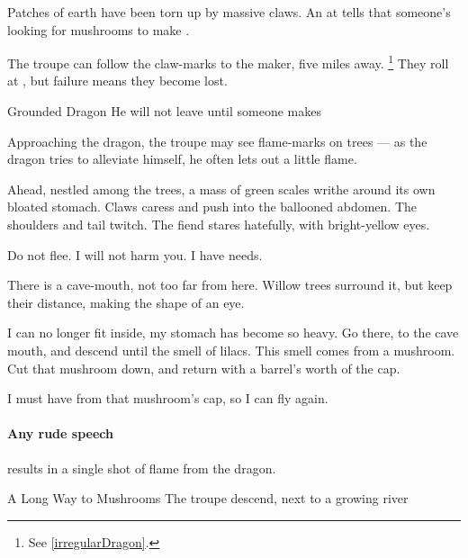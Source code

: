 \documentclass[10pt,twoside]{book}
\begin{document}
Patches of earth have been torn up by massive claws.
An  at \tn[12] tells  that someone's looking for mushrooms to make .

The troupe can follow the claw-marks to the maker, five miles away.%
\footnote{See \vref{irregularDragon}.}
They roll  at \tn[6], but failure means they become lost.

{Grounded Dragon}%
{He will not leave until someone makes }%

\label{irregularDragon}

Approaching the dragon, the troupe may see flame-marks on trees --- as the dragon tries to alleviate himself, he often lets out a little flame.

\begin{boxtext}
  Ahead, nestled among the trees, a mass of green scales writhe around its own bloated stomach.
  Claws caress and push into the ballooned abdomen.
  The shoulders and tail twitch.
  The \gls{fiend} stares hatefully, with bright-yellow eyes.
\end{boxtext}

\begin{speechtext}
  Do not flee.
  I will not harm you.
  I have needs.

  There is a cave-mouth, not too far from here.
  Willow trees surround it, but keep their distance, making the shape of an eye.

  I can no longer fit inside, my stomach has become so heavy.
  Go there, to the cave mouth, and descend until the smell of lilacs.
  This smell comes from a mushroom.
  Cut that mushroom down, and return with a barrel's worth of the cap.

  I must have  from that mushroom's cap, so I can fly again.
\end{speechtext}

\dragon

\paragraph{Any rude speech}
results in a single shot of flame from the dragon.

{A Long Way to Mushrooms}%
{The troupe descend, next to a growing river}%


\end{document}
